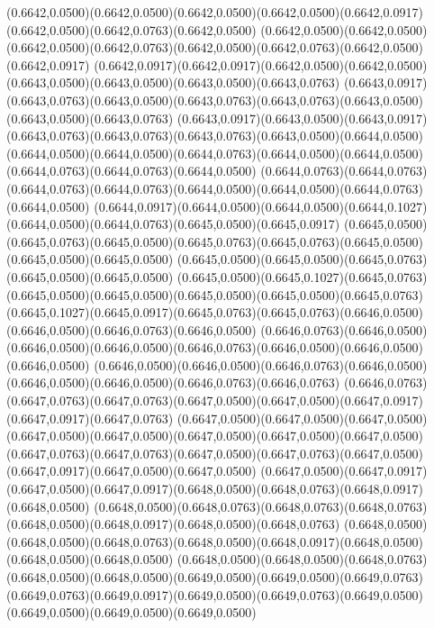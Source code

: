 (0.6642,0.0500)(0.6642,0.0500)(0.6642,0.0500)(0.6642,0.0500)(0.6642,0.0917)(0.6642,0.0500)(0.6642,0.0763)(0.6642,0.0500)
(0.6642,0.0500)(0.6642,0.0500)(0.6642,0.0500)(0.6642,0.0763)(0.6642,0.0500)(0.6642,0.0763)(0.6642,0.0500)(0.6642,0.0917)
(0.6642,0.0917)(0.6642,0.0917)(0.6642,0.0500)(0.6642,0.0500)(0.6643,0.0500)(0.6643,0.0500)(0.6643,0.0500)(0.6643,0.0763)
(0.6643,0.0917)(0.6643,0.0763)(0.6643,0.0500)(0.6643,0.0763)(0.6643,0.0763)(0.6643,0.0500)(0.6643,0.0500)(0.6643,0.0763)
(0.6643,0.0917)(0.6643,0.0500)(0.6643,0.0917)(0.6643,0.0763)(0.6643,0.0763)(0.6643,0.0763)(0.6643,0.0500)(0.6644,0.0500)
(0.6644,0.0500)(0.6644,0.0500)(0.6644,0.0763)(0.6644,0.0500)(0.6644,0.0500)(0.6644,0.0763)(0.6644,0.0763)(0.6644,0.0500)
(0.6644,0.0763)(0.6644,0.0763)(0.6644,0.0763)(0.6644,0.0763)(0.6644,0.0500)(0.6644,0.0500)(0.6644,0.0763)(0.6644,0.0500)
(0.6644,0.0917)(0.6644,0.0500)(0.6644,0.0500)(0.6644,0.1027)(0.6644,0.0500)(0.6644,0.0763)(0.6645,0.0500)(0.6645,0.0917)
(0.6645,0.0500)(0.6645,0.0763)(0.6645,0.0500)(0.6645,0.0763)(0.6645,0.0763)(0.6645,0.0500)(0.6645,0.0500)(0.6645,0.0500)
(0.6645,0.0500)(0.6645,0.0500)(0.6645,0.0763)(0.6645,0.0500)(0.6645,0.0500)
\PST@Solid(0.6645,0.0500)(0.6645,0.1027)(0.6645,0.0763)(0.6645,0.0500)(0.6645,0.0500)(0.6645,0.0500)(0.6645,0.0500)(0.6645,0.0763)
(0.6645,0.1027)(0.6645,0.0917)(0.6645,0.0763)(0.6645,0.0763)(0.6646,0.0500)(0.6646,0.0500)(0.6646,0.0763)(0.6646,0.0500)
(0.6646,0.0763)(0.6646,0.0500)(0.6646,0.0500)(0.6646,0.0500)(0.6646,0.0763)(0.6646,0.0500)(0.6646,0.0500)(0.6646,0.0500)
(0.6646,0.0500)(0.6646,0.0500)(0.6646,0.0763)(0.6646,0.0500)(0.6646,0.0500)(0.6646,0.0500)(0.6646,0.0763)(0.6646,0.0763)
(0.6646,0.0763)(0.6647,0.0763)(0.6647,0.0763)(0.6647,0.0500)(0.6647,0.0500)(0.6647,0.0917)(0.6647,0.0917)(0.6647,0.0763)
(0.6647,0.0500)(0.6647,0.0500)(0.6647,0.0500)(0.6647,0.0500)(0.6647,0.0500)(0.6647,0.0500)(0.6647,0.0500)(0.6647,0.0500)
(0.6647,0.0763)(0.6647,0.0763)(0.6647,0.0500)(0.6647,0.0763)(0.6647,0.0500)(0.6647,0.0917)(0.6647,0.0500)(0.6647,0.0500)
(0.6647,0.0500)(0.6647,0.0917)(0.6647,0.0500)(0.6647,0.0917)(0.6648,0.0500)(0.6648,0.0763)(0.6648,0.0917)(0.6648,0.0500)
(0.6648,0.0500)(0.6648,0.0763)(0.6648,0.0763)(0.6648,0.0763)(0.6648,0.0500)(0.6648,0.0917)(0.6648,0.0500)(0.6648,0.0763)
(0.6648,0.0500)(0.6648,0.0500)(0.6648,0.0763)(0.6648,0.0500)(0.6648,0.0917)(0.6648,0.0500)(0.6648,0.0500)(0.6648,0.0500)
(0.6648,0.0500)(0.6648,0.0500)(0.6648,0.0763)(0.6648,0.0500)(0.6648,0.0500)(0.6649,0.0500)(0.6649,0.0500)(0.6649,0.0763)
(0.6649,0.0763)(0.6649,0.0917)(0.6649,0.0500)(0.6649,0.0763)(0.6649,0.0500)(0.6649,0.0500)(0.6649,0.0500)(0.6649,0.0500)
